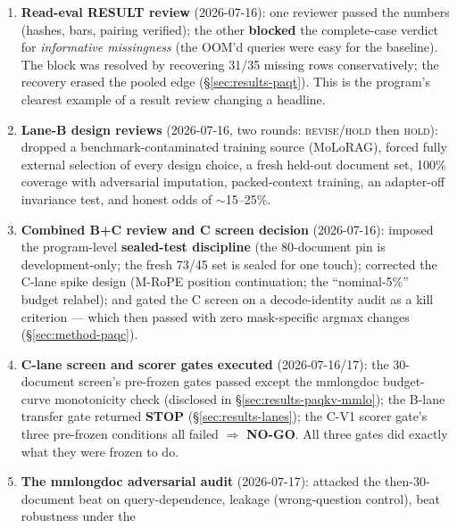 \documentclass[11pt,letterpaper]{article}
\begin{document}
\begin{enumerate}
        blast-radius diagnostic, the clean regeneration of the recall gate, and the reversibility
        robustness check all followed from it; also forced the gate-pinned auditable fold map,
        per-cell power floors, per-cell missingness sensitivity, and the reframing of the claim
        as ``cross-validated, benchmark-supervised (not zero-shot).''
  \item \textbf{Read-eval RESULT review} (2026-07-16): one reviewer passed the numbers
        (hashes, bars, pairing verified); the other \textbf{blocked} the complete-case verdict
        for \emph{informative missingness} (the OOM'd queries were easy for the baseline). The
        block was resolved by recovering 31/35 missing rows conservatively; the recovery erased
        the pooled edge (\S\ref{sec:results-paqt}). This is the program's clearest example of a
        result review changing a headline.
  \item \textbf{Lane-B design reviews} (2026-07-16, two rounds:
        \textsc{revise/hold} then \textsc{hold}): dropped a benchmark-contaminated training
        source (MoLoRAG), forced fully external selection of every design choice, a fresh
        held-out document set, 100\% coverage with adversarial imputation, packed-context
        training, an adapter-off invariance test, and honest odds of $\sim$15--25\%.
  \item \textbf{Combined B+C review and C screen decision} (2026-07-16): imposed the
        program-level \textbf{sealed-test discipline} (the 80-document pin is development-only;
        the fresh 73/45 set is sealed for one touch); corrected the C-lane spike design (M-RoPE
        position continuation; the ``nominal-5\%'' budget relabel); and gated the C screen on a
        decode-identity audit as a kill criterion --- which then passed with zero mask-specific
        argmax changes (\S\ref{sec:method-paqc}).
  \item \textbf{C-lane screen and scorer gates executed} (2026-07-16/17): the 30-document
        screen's pre-frozen gates passed except the mmlongdoc budget-curve monotonicity check
        (disclosed in \S\ref{sec:results-paqkv-mmlo}); the B-lane transfer gate returned
        \textbf{STOP} (\S\ref{sec:results-lanes}); the C-V1 scorer gate's three pre-frozen
        conditions all failed $\Rightarrow$ \textbf{NO-GO}. All three gates did exactly what
        they were frozen to do.
  \item \textbf{The mmlongdoc adversarial audit} (2026-07-17): attacked the then-30-document
        beat on query-dependence, leakage (wrong-question control), beat robustness under the

\end{enumerate}
\end{document}
